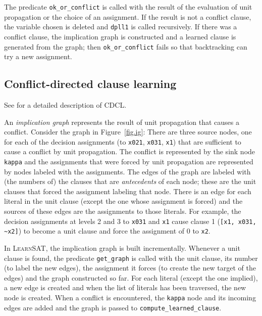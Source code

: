 \documentclass[11pt]{article}
\newcommand*{\p}[1]{\textup{\texttt{#1}}}
\newcommand*{\ls}{\textsc{LearnSAT}}
\begin{document}
The predicate \p{ok\_or\_conflict} is called with the result of the
evaluation of unit propagation or the choice of an assignment. If the
result is not a conflict clause, the variable chosen is deleted and
\p{dpll1} is called recursively. If there was a conflict clause, the
implication graph is constructed and a learned clause is generated from
the graph; then \p{ok\_or\_conflict} fails so that backtracking can try
a new assignment.

\subsection{Conflict-directed clause learning}

See \cite{mlm} for a detailed description of CDCL.

An \emph{implication graph} represents the result of unit propagation
that causes a conflict. Consider the graph in Figure~\ref{fig.ig}: There
are three source nodes, one for each of the decision assignments (to
\p{x021}, \p{x031}, \p{x1}) that are sufficient to cause a conflict by
unit propagation. The conflict is represented by the sink node \p{kappa}
and the assignments that were forced by unit propagation are represented
by nodes labeled with the assignments. The edges of the graph are
labeled with (the numbers of) the clauses that are \emph{antecedents} of
each node; these are the unit clauses that forced the assignment
labeling that node. There is an edge for each literal in the unit clause
(except the one whose assignment is forced) and the sources of these
edges are the assignments to those literals. For example, the decision
assignments at levels 2 and 3 to \p{x031} and \p{x1} cause clause 1
(\verb+[x1, x031, ~x2]+) to become a unit clause and force the
assignment of 0 to \p{x2}.

In \ls{}, the implication graph is built incrementally. Whenever a unit
clause is found, the predicate \p{get\_graph} is called with the unit
clause, its number (to label the new edges), the assignment it forces
(to create the new target of the edges) and the graph constructed so
far. For each literal (except the one implied), a new edge is created
and when the list of literals has been traversed, the new node is
created. When a conflict is encountered, the \p{kappa} node and its
incoming edges are added and the graph is passed to
\p{compute\_learned\_clause}.
\end{document}
